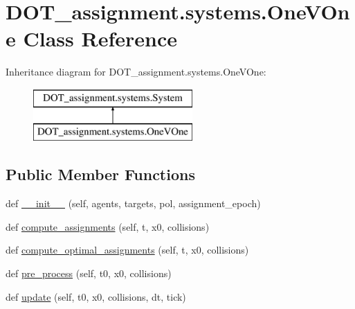 \hypertarget{class_d_o_t__assignment_1_1systems_1_1_one_v_one}{}\section{D\+O\+T\+\_\+assignment.\+systems.\+One\+V\+One Class Reference}
\label{class_d_o_t__assignment_1_1systems_1_1_one_v_one}
Inheritance diagram for D\+O\+T\+\_\+assignment.\+systems.\+One\+V\+One\+:\begin{figure}[H]
\begin{center}
\leavevmode
\includegraphics[height=2.000000cm]{class_d_o_t__assignment_1_1systems_1_1_one_v_one}
\end{center}
\end{figure}
\subsection*{Public Member Functions}
\begin{DoxyCompactItemize}
\item 
def \mbox{\hyperlink{class_d_o_t__assignment_1_1systems_1_1_one_v_one_af1b5a9b54110a79dbcd85f09ac343d7a}{\+\_\+\+\_\+init\+\_\+\+\_\+}} (self, agents, targets, pol, assignment\+\_\+epoch)
\item 
def \mbox{\hyperlink{class_d_o_t__assignment_1_1systems_1_1_one_v_one_aa5b2a62d904ce5fbbc229c861c20c2b3}{compute\+\_\+assignments}} (self, t, x0, collisions)
\item 
def \mbox{\hyperlink{class_d_o_t__assignment_1_1systems_1_1_one_v_one_ad4469fcccbebd08f45e7b9a2187b96a5}{compute\+\_\+optimal\+\_\+assignments}} (self, t, x0, collisions)
\item 
def \mbox{\hyperlink{class_d_o_t__assignment_1_1systems_1_1_one_v_one_a4056ed3fbb2f274091018b67b9183348}{pre\+\_\+process}} (self, t0, x0, collisions)
\item 
def \mbox{\hyperlink{class_d_o_t__assignment_1_1systems_1_1_one_v_one_a8a5d76d462e6208f560f3398578ea19c}{update}} (self, t0, x0, collisions, dt, tick)
\end{DoxyCompactItemize}
